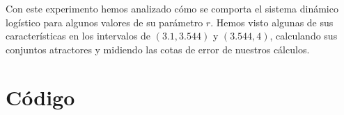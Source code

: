 \documentclass[a4paper]{article}
\begin{document}
	Con este experimento hemos analizado cómo se comporta el sistema dinámico logístico para algunos valores de su parámetro $r$. Hemos visto algunas de sus características en los intervalos de $(3.1,3.544)$ y $(3.544,4)$, calculando sus conjuntos atractores y midiendo las cotas de error de nuestros cálculos.

%	
	
	
%	
%	
%	
%	

	\newpage
	\section{Código}\label{codigo}
	
	
	
\end{document}

